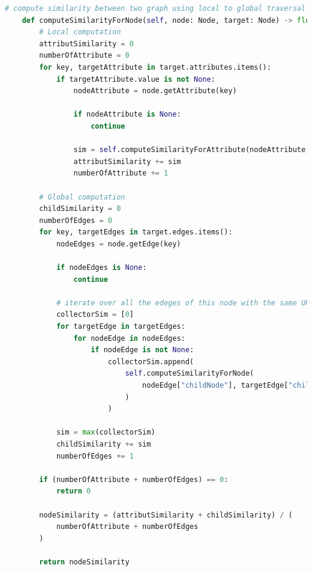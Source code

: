 \begin{lstlisting}[language=Python, caption=Function to Find the Similarity Between Two Cases (Full), label={lst:comp-sim-node-all}]
# compute similarity between two graph using local to global traversal
    def computeSimilarityForNode(self, node: Node, target: Node) -> float:
        # Local computation
        attributSimilarity = 0
        numberOfAttribute = 0
        for key, targetAttribute in target.attributes.items():
            if targetAttribute.value is not None:
                nodeAttribute = node.getAttribute(key)

                if nodeAttribute is None:
                    continue

                sim = self.computeSimilarityForAttribute(nodeAttribute, targetAttribute)
                attributSimilarity += sim
                numberOfAttribute += 1

        # Global computation
        childSimilarity = 0
        numberOfEdges = 0
        for key, targetEdges in target.edges.items():
            nodeEdges = node.getEdge(key)

            if nodeEdges is None:
                continue

            # iterate over all the edeges of this node with the same URI
            collectorSim = [0]
            for targetEdge in targetEdges:
                for nodeEdge in nodeEdges:
                    if nodeEdge is not None:
                        collectorSim.append(
                            self.computeSimilarityForNode(
                                nodeEdge["childNode"], targetEdge["childNode"]
                            )
                        )

            sim = max(collectorSim)
            childSimilarity += sim
            numberOfEdges += 1

        if (numberOfAttribute + numberOfEdges) == 0:
            return 0

        nodeSimilarity = (attributSimilarity + childSimilarity) / (
            numberOfAttribute + numberOfEdges
        )

        return nodeSimilarity
\end{lstlisting}


\clearpage
